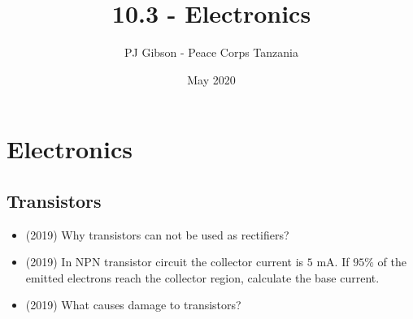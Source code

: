 \documentclass{article}
\title{10.3 - Electronics}
\author{PJ Gibson - Peace Corps Tanzania}
\date{May 2020}
\begin{document}
\maketitle


\section{Electronics}

\subsection{Transistors}
\begin{itemize}
\item (2019)  Why transistors can not be used as rectifiers? 
\item (2019)  In NPN transistor circuit the collector current is $ 5$ mA. If $ 95\%$ of the emitted electrons reach the collector region, calculate the base current. 
\item (2019)  What causes damage to transistors? 
\end{itemize}
\end{document}
